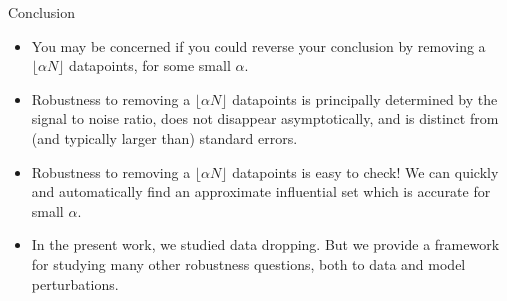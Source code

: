 

\begin{frame}{Conclusion}

\begin{itemize}
\item You may be concerned if you could reverse your conclusion by removing
a $\lfloor \alpha N \rfloor$ datapoints, for some small $\alpha$.

\pause
\item Robustness to removing a $\lfloor \alpha N \rfloor$ datapoints is
principally determined by the signal to noise ratio, does not disappear
asymptotically, and is distinct from (and typically larger than) standard
errors.

\pause
\item Robustness to removing a $\lfloor \alpha N \rfloor$ datapoints is
easy to check!  We can quickly and automatically find an
approximate influential set which is accurate for small $\alpha$.

\pause
\item In the present work, we studied data dropping.  But we
provide a framework for studying many other robustness
questions, both to data and model perturbations.


\end{itemize}

\end{frame}

